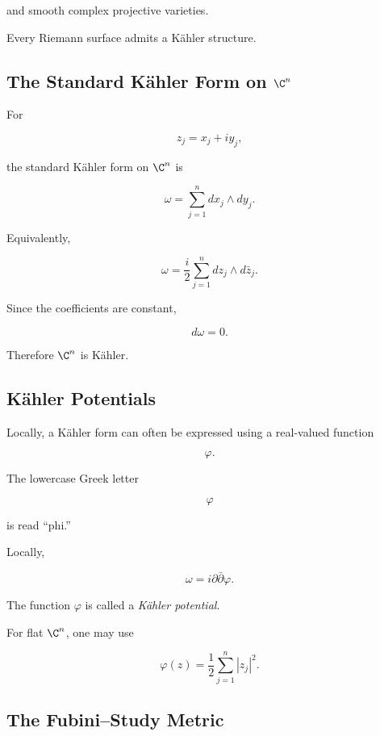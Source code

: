 and smooth complex projective varieties.

Every Riemann surface admits a K\"ahler structure.

\subsection{The Standard K\"ahler Form on \(\C^n\)}
\label{subsec:standard-kahler-form}

For

\[
z_j=x_j+iy_j,
\]

the standard K\"ahler form on \(\C^n\) is

\[
\boxed{
\omega
=
\sum_{j=1}^{n}
dx_j\wedge dy_j.
}
\]

Equivalently,

\[
\boxed{
\omega
=
\frac{i}{2}
\sum_{j=1}^{n}
dz_j\wedge d\bar z_j.
}
\]

Since the coefficients are constant,

\[
d\omega=0.
\]

Therefore \(\C^n\) is K\"ahler.

\subsection{K\"ahler Potentials}
\label{subsec:kahler-potentials}

Locally, a K\"ahler form can often be expressed using a real-valued function

\[
\varphi.
\]

The lowercase Greek letter

\[
\varphi
\]

is read ``phi.''

Locally,

\[
\boxed{
\omega
=
i\partial\bar{\partial}\varphi.
}
\]

The function \(\varphi\) is called a \emph{K\"ahler potential}.

For flat \(\C^n\), one may use

\[
\boxed{
\varphi(z)
=
\frac12
\sum_{j=1}^{n}|z_j|^2.
}
\]

\subsection{The Fubini--Study Metric}
\label{subsec:fubini-study}

